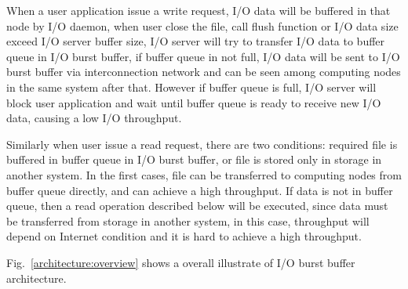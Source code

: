 When a user application issue a write request, I/O data will be buffered in that node by I/O daemon, when user close the file, call flush function or I/O data size exceed I/O server buffer size, I/O server will try to transfer I/O data to buffer queue in I/O burst buffer, if buffer queue in not full, I/O data will be sent to I/O burst buffer via interconnection network and can be seen among computing nodes in the same system after that.
However if buffer queue is full, I/O server will block user application and wait until buffer queue is ready to receive new I/O data, causing a low I/O throughput.


Similarly when user issue a read request, there are two conditions: required file is buffered in buffer queue in I/O burst buffer, or file is stored only in storage in another system.
In the first cases, file can be transferred to computing nodes from buffer queue directly, and can achieve a high throughput.
If data is not in buffer queue, then a read operation described below will be executed, since data must be transferred from storage in another system, in this case, throughput will depend on Internet condition and it is hard to achieve a high throughput.

Fig.~\ref{architecture:overview} shows a overall illustrate of I/O burst buffer architecture.